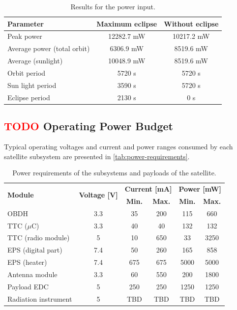 \begin{table}[!htb]
    \centering
    \begin{tabular}{lcc}
        \toprule[1.5pt]
        \textbf{Parameter} & \textbf{Maximum eclipse} & \textbf{Without eclipse} \\    \midrule
        Peak power & 12282.7 mW & 10217.2 mW\\
        Average power (total orbit) & 6306.9 mW & 8519.6 mW \\
        Average (sunlight) & 10048.9 mW & 8519.6 mW\\
        Orbit period & 5720 s & 5720 s \\
        Sun light period &  3590 s & 5720 s\\
        Eclipse period & 2130 s & 0 s \\
        \bottomrule[1.5pt]
    \end{tabular}
    \caption{Results for the power input.}
    \label{tab:power-simulations}
\end{table}


\subsection{ \textcolor{red}{TODO} Operating Power Budget}

Typical operating voltages and current and power ranges consumed by each satellite subsystem are presented in \autoref{tab:power-requirements}.

\begin{table}[!h]
    \centering
    \begin{tabular}{lccccc}
        \toprule[1.5pt]
        \multirow{2}{*}{\textbf{Module}} & \multirow{2}{*}{\textbf{Voltage [V]}}    & \multicolumn{2}{c}{\textbf{Current [mA]}} & \multicolumn{2}{c}{\textbf{Power [mW]}} \\
                                         &                                          & \textbf{Min.} & \textbf{Max.}             & \textbf{Min.} & \textbf{Max.} \\
        \midrule
        OBDH                & 3.3   & 35    & 200   & 115   & 660 \\
        TTC ($\mu$C)        & 3.3   & 40    & 40    & 132   & 132 \\
        TTC (radio module)  & 5     & 10    & 650   & 33    & 3250 \\
        EPS (digital part)  & 7.4   & 50    & 260   & 165   & 858 \\
        EPS (heater)        & 7.4   & 675   & 675   & 5000  & 5000 \\
        Antenna module      & 3.3   & 60    & 550   & 200   & 1800 \\
        Payload EDC         & 5     & 250   & 250   & 1250  & 1250 \\
        Radiation instrument           & 5     & TBD   & TBD   & TBD   & TBD \\
        \bottomrule[1.5pt]
    \end{tabular}
    \caption{Power requirements of the subsystems and payloads of the satellite.}
    \label{tab:power-requirements}
\end{table}

